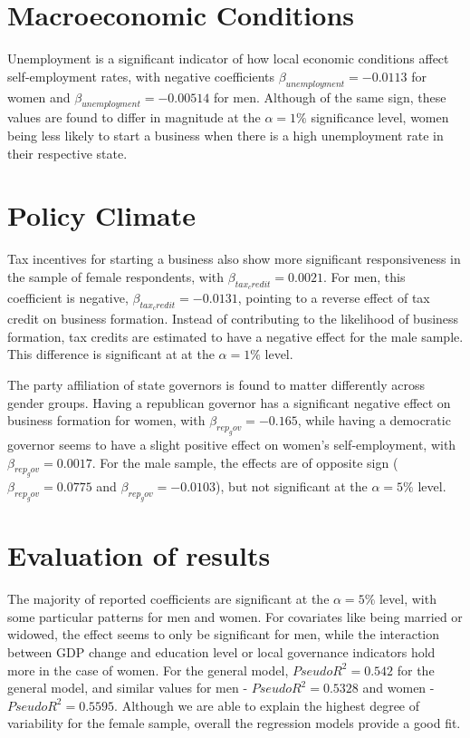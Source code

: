 \section{Macroeconomic Conditions}

Unemployment is a significant indicator of how local economic conditions affect self-employment rates, with negative coefficients $\beta_{unemployment} = -0.0113$ for women and $\beta_{unemployment} = -0.00514$ for men. Although of the same sign, these values are found to differ in magnitude at the $\alpha = 1\% $ significance level, women being less likely to start a business when there is a high unemployment rate in their respective state. 

\section{Policy Climate}
Tax incentives for starting a business also show more significant responsiveness in the sample of female respondents, with  $\beta_{tax_credit} = 0.0021$. For men, this coefficient is negative, $\beta_{tax_credit} = -0.0131$, pointing to a reverse effect of tax credit on business formation. Instead of contributing to the likelihood of business formation, tax credits are estimated to have a negative effect for the male sample. This difference is significant at at the $\alpha = 1\% $ level. 

The party affiliation of state governors is found to matter differently across gender groups. Having a republican governor has a significant negative effect on business formation for women, with $\beta_{rep_gov} = -0.165$, while having a democratic governor seems to have a slight positive effect on women’s self-employment, with  $\beta_{rep_gov} = 0.0017$. For the male sample, the effects are of opposite sign ($\beta_{rep_gov} = 0.0775$ and $\beta_{rep_gov} = -0.0103$), but not significant at the $\alpha = 5\% $ level. 

\section{Evaluation of results}
The majority of reported coefficients are significant at the $\alpha = 5\% $ level, with some particular patterns for men and women. For covariates like being married or widowed, the effect seems to only be significant for men, while the interaction between GDP change and education level or local governance indicators hold more in the case of women. For the general model, $PseudoR^2 = 0.542$ for the general model, and similar values for men - $PseudoR^2 = 0.5328$ and women - $PseudoR^2 = 0.5595$. Although we are able to explain the highest degree of variability for the female sample, overall the regression models provide a good fit.























